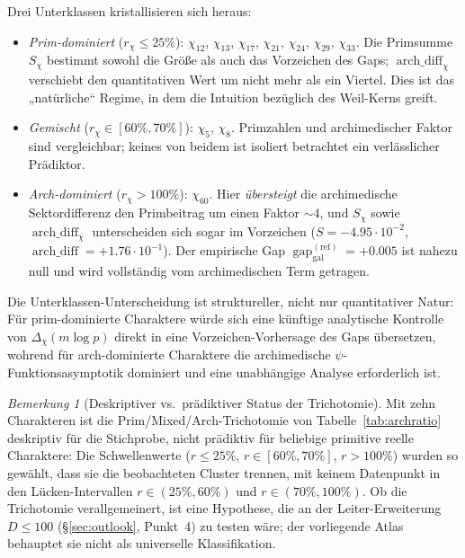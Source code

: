\documentclass[a4paper,10pt,twocolumn]{article}
\theoremstyle{definition}
\theoremstyle{remark}
\newtheorem{remark}[theorem]{Bemerkung}
\newcommand{\gap}{\operatorname{gap}}
\newcommand{\chifn}{\chi}
\newcommand{\Deltachi}{\Delta_{\chifn}}
\newcommand{\archdiff}{\operatorname{arch\_diff}}
\begin{document}
Drei Unterklassen kristallisieren sich heraus:
\begin{itemize}
  \item \emph{Prim-dominiert} ($r_{\chifn}\leq 25\%$):
    $\chifn_{12}$, $\chifn_{13}$, $\chifn_{17}$, $\chifn_{21}$,
    $\chifn_{24}$, $\chifn_{29}$, $\chifn_{33}$. Die Primsumme
    $S_{\chifn}$ bestimmt sowohl die Größe als auch das Vorzeichen des Gaps;
    $\archdiff_{\chifn}$ verschiebt den quantitativen Wert um nicht mehr
    als ein Viertel. Dies ist das „natürliche“ Regime, in dem die
    Intuition bezüglich des Weil-Kerns greift.
  \item \emph{Gemischt} ($r_{\chifn}\in[60\%,70\%]$):
    $\chifn_5$, $\chifn_8$. Primzahlen und archimedischer Faktor sind
    vergleichbar; keines von beidem ist isoliert betrachtet ein verlässlicher Prädiktor.
  \item \emph{Arch-dominiert} ($r_{\chifn}>100\%$):
    $\chifn_{60}$. Hier \emph{übersteigt} die archimedische Sektordifferenz
    den Primbeitrag um einen Faktor $\sim 4$, und
    $S_{\chifn}$ sowie $\archdiff_{\chifn}$ unterscheiden sich sogar im Vorzeichen
    ($S=-4.95\!\cdot\!10^{-2}$, $\archdiff=+1.76\!\cdot\!10^{-1}$).
    Der empirische Gap $\gap_{\mathrm{gal}}^{(\mathrm{ref})}=+0.005$ ist nahezu null und
    wird vollständig vom archimedischen Term getragen.
\end{itemize}

Die Unterklassen-Unterscheidung ist struktureller, nicht nur quantitativer Natur: Für
prim-dominierte Charaktere würde sich eine künftige analytische Kontrolle von
$\Deltachi(m\log p)$ direkt in eine Vorzeichen-Vorhersage des Gaps übersetzen,
wohrend für arch-dominierte Charaktere die archimedische
$\psi$-Funktionsasymptotik dominiert und eine unabhängige Analyse erforderlich ist.

\begin{remark}[Deskriptiver vs.\ prädiktiver Status der Trichotomie]
\label{rem:trichotomy-descriptive}
Mit zehn Charakteren ist die Prim/Mixed/Arch-Trichotomie von
Tabelle~\ref{tab:archratio} deskriptiv für die Stichprobe, nicht
prädiktiv für beliebige primitive reelle Charaktere: Die Schwellenwerte
($r\leq 25\%$, $r\in[60\%,70\%]$, $r>100\%$) wurden so gewählt, dass
sie die beobachteten Cluster trennen, mit keinem Datenpunkt in den
Lücken-Intervallen $r\in(25\%,60\%)$ und $r\in(70\%,100\%)$. Ob die
Trichotomie verallgemeinert, ist eine Hypothese, die an der
Leiter-Erweiterung $D\leq 100$ (\S\ref{sec:outlook}, Punkt~4) zu testen
wäre; der vorliegende Atlas behauptet sie nicht als universelle
Klassifikation.
\end{remark}
\end{document}

